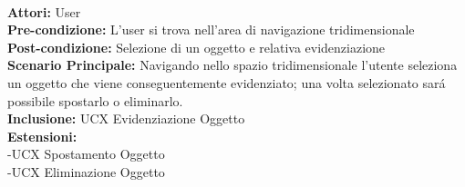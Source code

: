 \vspace{0.5cm}

\large\textbf{} \\
\textbf{Attori:} User\\
\textbf{Pre-condizione:} L'user si trova nell'area di navigazione tridimensionale \\
\textbf{Post-condizione: } Selezione di un oggetto e relativa evidenziazione\\
\textbf{Scenario Principale:}  Navigando nello spazio tridimensionale l'utente seleziona un oggetto che viene conseguentemente evidenziato; una volta selezionato sará possibile spostarlo o eliminarlo.\\
\textbf{Inclusione:} UCX Evidenziazione Oggetto \\
\textbf{Estensioni:} \\ 
-UCX Spostamento Oggetto \\ -UCX Eliminazione Oggetto

\vspace{0.5cm}
